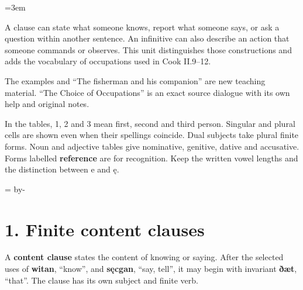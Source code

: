 \newcommand{\runningtitle}{Unit 9. Complements and reports}

\emergencystretch=3em
\newcommand{\itempara}[2]{\par\addvspace{3pt}\noindent\hangindent=1.8em\hangafter=1\makebox[1.8em][l]{#1.}#2\par}
\newcommand{\reserve}[1]{\par\penalty-100\begingroup\dimen0=\pagegoal\advance\dimen0 by-\pagetotal\ifdim\dimen0<#1\newpage\fi\endgroup}

\raggedright
{}

A clause can state what someone knows, report what someone says, or ask a question within another sentence. An infinitive can also describe an action that someone commands or observes. This unit distinguishes those constructions and adds the vocabulary of occupations used in Cook II.9–12.

The examples and “The fisherman and his companion” are new teaching material. “The Choice of Occupations” is an exact source dialogue with its own help and original notes.

In the tables, 1, 2 and 3 mean first, second and third person. Singular and plural cells are shown even when their spellings coincide. Dual subjects take plural finite forms. Noun and adjective tables give nominative, genitive, dative and accusative. Forms labelled \textbf{reference} are for recognition. Keep the written vowel lengths and the distinction between e and ę.

\reserve{7\baselineskip}
\section*{1. Finite content clauses}

A \textbf{content clause} states the content of knowing or saying. After the selected uses of \textbf{witan}, “know”, and \textbf{sęcgan}, “say, tell”, it may begin with invariant \textbf{ðæt}, “that”. The clause has its own subject and finite verb.

